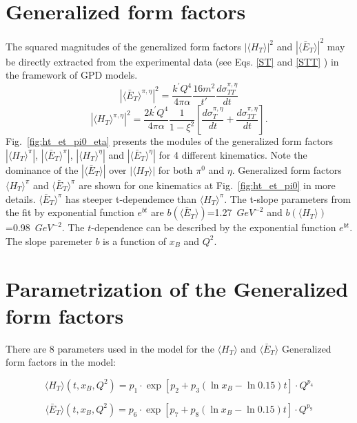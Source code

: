 \documentclass[prc,floatfix,superscriptaddress]{revtex4}
\newcommand{\GPDHT}{\langle H_T \rangle}
\newcommand{\GPDETbar}{\langle \bar{E}_T \rangle}
\begin{document}
\section{Generalized form factors}
The squared magnitudes of the 
generalized form factors
$\left|\GPDHT\right|^2$ and 
$\left|\GPDETbar\right|^2$  
may be directly extracted from the experimental data (see Eqs. \ref{ST} and \ref{STT} ) in the framework of GPD models.
\begin{equation}\label{ET}
\left|\GPDETbar^{\pi,\eta}\right |^2=\frac{k^\prime Q^4}{4\pi\alpha}     \frac{16m^2}{t'} \frac{d\sigma^{\pi,\eta}_{TT}}{dt} 
\end{equation}
\begin{equation}\label{HT}
\left| \GPDHT^{\pi,\eta}\right|^2=\frac{2k^\prime Q^4}{4\pi\alpha}       \frac{1}{1-\xi^2} \left [ \frac{d\sigma^{\pi,\eta}_{T}}{dt} + \frac{d\sigma^{\pi,\eta}_{TT}}{dt} \right ].
\end{equation}
\noindent
Fig.~\ref{fig:ht_et_pi0_eta} presents the modules of the generalized form factors
$\left|\GPDHT^\pi\right|$, $\left|\GPDETbar^\pi\right|$, $\left|\GPDHT^\eta\right|$ and $\left|\GPDETbar^\eta\right|$
 for 4 different kinematics. 
  Note the dominance of the $\left|\GPDETbar\right|$ over $\left|\GPDHT\right|$ for both $\pi^0$ and $\eta$.
Generalized form factors $\GPDHT^\pi$ and $\GPDETbar^\pi$ are shown for one kinematics at Fig.~\ref{fig:ht_et_pi0} in more details. 
 $\GPDETbar^\pi$ has steeper t-dependemce than $\GPDHT^\pi$. The t-slope parameters from the fit by  
 exponential function $e^{bt}$ are 
 $b(\GPDETbar)$=1.27~$GeV^{-2}$ and $b(\GPDHT)$=0.98~$GeV^{-2}$.
 The $t$-dependence can be described by the exponential function $e^{bt}$. The slope paremeter $b$ is a function of $x_B$ and $Q^2$.


\section{Parametrization of the Generalized form factors}
There are 8 parameters used in the model  for the $\GPDHT$   and $\GPDETbar$ Generalized form factors in the model:  

\begin{equation}
\label{GFF:HT}
\GPDHT(t,x_B,Q^2)=p_1\cdot \exp[p_2+p_3(\ln x_B-\ln0.15)t]\cdot Q^{p_4}
\end{equation}

\begin{equation}
\label{GFF:ET}
\GPDETbar(t,x_B,Q^2)=p_6\cdot \exp[p_7+p_8(\ln x_B-\ln0.15)t]\cdot Q^{p_9}
\end{equation}
\end{document}
